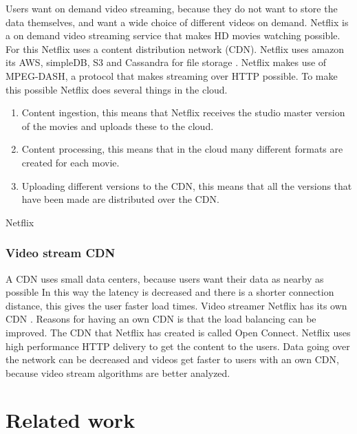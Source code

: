 \documentclass{sig-alternate-br}
\begin{document}
Users want on demand video streaming, because they do not want to store the data themselves, and want a wide choice of different videos on demand. Netflix is a on demand video streaming service that makes HD movies watching possible. For this Netflix uses a content distribution network (CDN). Netflix uses amazon its AWS, simpleDB, S3 and Cassandra for file storage \cite{Adhikari:2012}. Netflix makes use of MPEG-DASH, a protocol that makes streaming over HTTP possible. To make this possible Netflix does several things in the cloud. 

 \begin{enumerate}[topsep=0pt,itemsep=-1ex,partopsep=1ex,parsep=1ex]
 	\item Content ingestion, this means that Netflix receives the studio master version of the movies and uploads these to the cloud. 
 	\item Content processing, this means that in the cloud many different formats are created for each movie.
 	\item Uploading different versions to the CDN,	this means that all the versions that have been made are distributed over the CDN.
 \end{enumerate}
Netflix ~\cite{Adhikari:2012}




\subsubsection{Video stream CDN}
A CDN uses small data centers, because users want their data as nearby as possible  In this way the latency is decreased and there is a shorter connection distance, this gives the user faster load times. Video streamer Netflix has  its own CDN \cite{netflix}. Reasons for having an own CDN is that the load balancing can be improved. The CDN that Netflix has created is called Open Connect. Netflix uses high performance HTTP delivery to get the content to the users. Data going over the network can be decreased and videos get faster to users with an own CDN, because video stream algorithms are better analyzed. 

\section{Related work}
\end{document}
